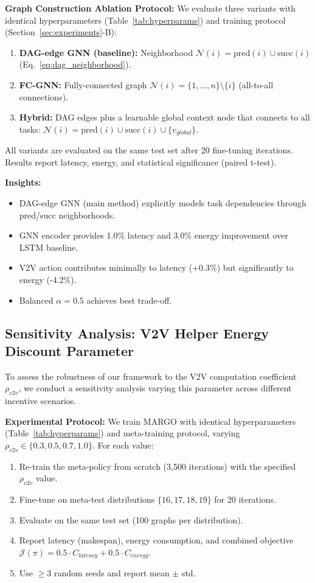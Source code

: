\documentclass[journal,twoside]{IEEEtran}
\newcommand{\method}{\textsc{MARGO}}
\begin{document}
\textbf{Graph Construction Ablation Protocol:}
We evaluate three variants with identical hyperparameters (Table~\ref{tab:hyperparams}) and training protocol (Section~\ref{sec:experiments}-B):
\begin{enumerate}
    \item \textbf{DAG-edge GNN (baseline):} Neighborhood $\mathcal{N}(i) = \text{pred}(i) \cup \text{succ}(i)$ (Eq.~\ref{eq:dag_neighborhood}).
    \item \textbf{FC-GNN:} Fully-connected graph $\mathcal{N}(i) = \{1, \ldots, n\} \setminus \{i\}$ (all-to-all connections).
    \item \textbf{Hybrid:} DAG edges plus a learnable global context node that connects to all tasks: $\mathcal{N}(i) = \text{pred}(i) \cup \text{succ}(i) \cup \{v_{global}\}$.
\end{enumerate}
All variants are evaluated on the same test set after 20 fine-tuning iterations. Results report latency, energy, and statistical significance (paired t-test).

\textbf{Insights:}
\begin{itemize}
    \item DAG-edge GNN (main method) explicitly models task dependencies through pred/succ neighborhoods.
    \item GNN encoder provides 1.0\% latency and 3.0\% energy improvement over LSTM baseline.
    \item V2V action contributes minimally to latency (+0.3\%) but significantly to energy (-4.2\%).
    \item Balanced $\alpha=0.5$ achieves best trade-off.
\end{itemize}

\subsection{Sensitivity Analysis: V2V Helper Energy Discount Parameter}

To assess the robustness of our framework to the V2V computation coefficient $\rho_{v2v}$, we conduct a sensitivity analysis varying this parameter across different incentive scenarios.

\textbf{Experimental Protocol:}
We train \method{} with identical hyperparameters (Table~\ref{tab:hyperparams}) and meta-training protocol, varying $\rho_{v2v} \in \{0.3, 0.5, 0.7, 1.0\}$. For each value:
\begin{enumerate}
    \item Re-train the meta-policy from scratch (3,500 iterations) with the specified $\rho_{v2v}$ value.
    \item Fine-tune on meta-test distributions $\{16, 17, 18, 19\}$ for 20 iterations.
    \item Evaluate on the same test set (100 graphs per distribution).
    \item Report latency (makespan), energy consumption, and combined objective $\mathcal{J}(\pi) = 0.5 \cdot C_{latency} + 0.5 \cdot C_{energy}$.
    \item Use $\geq 3$ random seeds and report mean $\pm$ std.
\end{enumerate}
\end{document}
